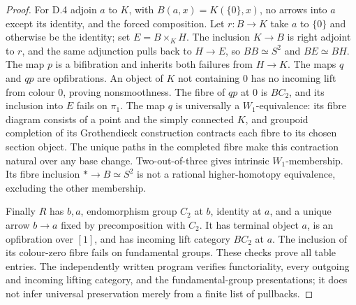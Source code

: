\begin{proof}
For D.4 adjoin $a$ to $K$, with $B(a,x)=K(\{0\},x)$, no arrows into $a$ except its identity, and the forced composition. Let $r:B\to K$ take $a$ to $\{0\}$ and otherwise be the identity; set $E=B\times_KH$. The inclusion $K\to B$ is right adjoint to $r$, and the same adjunction pulls back to $H\to E$, so $BB\simeq S^2$ and $BE\simeq BH$. The map $p$ is a bifibration and inherits both failures from $H\to K$. The maps $q$ and $qp$ are opfibrations. An object of $K$ not containing $0$ has no incoming lift from colour $0$, proving nonsmoothness. The fibre of $qp$ at $0$ is $BC_2$, and its inclusion into $E$ fails on $\pi_1$. The map $q$ is universally a $W_1$-equivalence: its fibre diagram consists of a point and the simply connected $K$, and groupoid completion of its Grothendieck construction contracts each fibre to its chosen section object. The unique paths in the completed fibre make this contraction natural over any base change. Two-out-of-three gives intrinsic $W_1$-membership. Its fibre inclusion $*\to B\simeq S^2$ is not a rational higher-homotopy equivalence, excluding the other membership.

Finally $R$ has $b,a$, endomorphism group $C_2$ at $b$, identity at $a$, and a unique arrow $b\to a$ fixed by precomposition with $C_2$. It has terminal object $a$, is an opfibration over $[1]$, and has incoming lift category $BC_2$ at $a$. The inclusion of its colour-zero fibre fails on fundamental groups. These checks prove all table entries. The independently written program verifies functoriality, every outgoing and incoming lifting category, and the fundamental-group presentations; it does not infer universal preservation merely from a finite list of pullbacks.
\end{proof}

